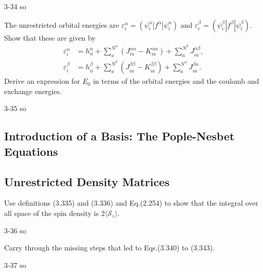 \documentclass[a4paper]{book}
\begin{document}
	\begin{solution}
		3-34 so
	\end{solution}
	
	\begin{exercise}
	The unrestricted orbital energies are $\varepsilon^\alpha_i = ( \psi^\alpha_i | f^\alpha | \psi^\alpha_i )$ and $\varepsilon^\beta_i = ( \psi^\beta_i | f^\beta | \psi^\beta_i )$. Show that these are given by
	\begin{align*}
		\varepsilon^\alpha_i &= h^\alpha_{ii} + \sum^{N^\alpha}_a \left( J^{\alpha\alpha}_{ia} - K^{\alpha\alpha}_{ia} \right) + \sum^{N^\beta}_a J^{\alpha\beta}_{ia} , \\
		 \varepsilon^\beta_i &= h^\beta_{ii} + \sum^{N^\beta}_a \left( J^{\beta\beta}_{ia} - K^{\beta\beta}_{ia} \right) + \sum^{N^\alpha}_a J^{\beta\alpha}_{ia} .
	\end{align*}
	Derive an expression for $E_0$ in terms of the orbital energies and the coulomb and exchange energies.
	\end{exercise}
	
	\begin{solution}
		3-35 so
	\end{solution}
	
	\subsection{Introduction of a Basis: The Pople-Nesbet Equations}
	
	\subsection{Unrestricted Density Matrices}
	\begin{exercise}
	Use definitions (3.335) and (3.336) and Eq.(2.254) to show that the integral over all space of the spin density is 2$\langle \mathscr{S}_z \rangle$.
	\end{exercise}
	
	\begin{solution}
		3-36 so
	\end{solution}
	
	\begin{exercise}
	Carry through the missing steps that led to Eqs.(3.340) to (3.343).
	\end{exercise}
	
	\begin{solution}
		3-37 so
	\end{solution}
	
\end{document}
